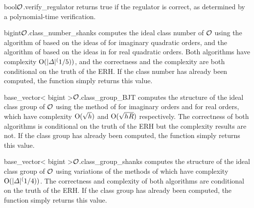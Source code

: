 
\begin{fcode}{bool}{$\mathcal{O}$.verify_regulator}{}
  returns true if the regulator is correct, as determined by a polynomial-time verification.
\end{fcode}

\begin{fcode}{bigint}{$\mathcal{O}$.class_number_shanks}{}
  computes the ideal class number of $\mathcal{O}$ using the algorithm of \cite{Fung/Williams:1990}
  based on the ideas of \cite{LenstraHW:1982} for imaginary quadratic orders, and the algorithm
  of \cite{Jacobson/Lukes/Williams:1995} based on the ideas in \cite{Mollin/Williams:1992} for
  real quadratic orders.  Both algorithms have complexity $\mathrm{O}(|\varDelta |^(1/5))$, and the
  correctness and the complexity are both conditional on the truth of the ERH.  If the class
  number has already been computed, the function simply returns this value.
\end{fcode}

\begin{fcode}{base_vector< bigint >}{$\mathcal{O}$.class_group_BJT}{}
  computes the structure of the ideal class group of $\mathcal{O}$ using the method of
  \cite{Buchmann/Jabobson/Teske:1997} for imaginary orders and \cite{Jacobson:1998} for real
  orders, which have complexity $\mathrm{O}(\sqrt{h})$ and $\mathrm{O}(\sqrt{h R})$ respectively.
  The correctness of both algorithms is conditional on the truth of the ERH but the complexity
  results are not.  If the class group has already been computed, the function simply returns
  this value.
\end{fcode}

\begin{fcode}{base_vector< bigint >}{$\mathcal{O}$.class_group_shanks}{}
  computes the structure of the ideal class group of $\mathcal{O}$ using variations of the methods of
  \cite{Schoof:1982} which have complexity $\mathrm{O}(|\varDelta|^(1/4))$.  The correctness and
  complexity of both algorithms are conditional on the truth of the ERH.  If the class group has
  already been computed, the function simply returns this value.
\end{fcode}

